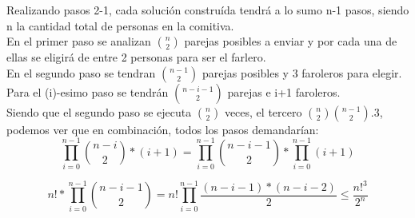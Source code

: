 \vspace*{1em}

Realizando pasos 2-1, cada solución construída tendrá a lo sumo n-1 pasos, siendo n la cantidad total de personas en la comitiva.\\

En el primer paso se analizan $\binom  {n} {2}$ parejas posibles a enviar y por cada una de ellas se eligirá de entre 2 personas para ser el farlero.\\

En el segundo paso se tendran $\binom  {n-1} {2}$ parejas posibles y 3 faroleros para elegir.\\

Para el (i)-esimo paso se tendrán $\binom  {n-i-1} {2}$ parejas e i+1 faroleros.\\

Siendo que el segundo paso se ejecuta $\binom  {n} {2}$ veces, el tercero $\binom  {n} {2} \binom{n-1} {2}.3$, podemos ver que en combinación, todos los pasos demandarían:
\[
\prod_{i=0}^{n-1}\binom {n-i}{2}*(i+1) = \prod_{i=0}^{n-1}\binom {n-i-1}{2} * \prod_{i=0}^{n-1}(i+1)
\]

\[
n! * \prod_{i=0}^{n-1}\binom {n-i-1}{2} = n! \prod_{i=0}^{n-1}\frac{(n-i-1)*(n-i-2)}{2} \leq \frac{n!^{3}}{2^{n}} 
\]